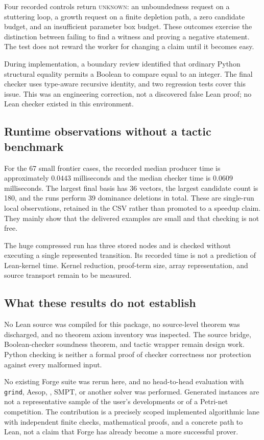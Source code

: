 \documentclass[11pt,a4paper]{article}
\newcommand{\code}[1]{\texttt{\detokenize{#1}}}
\newcommand{\grind}{\texttt{grind}}
\newcommand{\unknown}{\textsc{unknown}}
\theoremstyle{definition}
\theoremstyle{remark}
\begin{document}
Four recorded controls return \unknown{}: an unboundedness request on a stuttering loop, a growth request on a finite depletion path, a zero candidate budget, and an insufficient parameter box budget. These outcomes exercise the distinction between failing to find a witness and proving a negative statement. The test does not reward the worker for changing a claim until it becomes easy.

During implementation, a boundary review identified that ordinary Python structural equality permits a Boolean to compare equal to an integer. The final checker uses type-aware recursive identity, and two regression tests cover this issue. This was an engineering correction, not a discovered false Lean proof; no Lean checker existed in this environment.

\subsection{Runtime observations without a tactic benchmark}
For the 67 small frontier cases, the recorded median producer time is approximately $0.0443$ milliseconds and the median checker time is $0.0609$ milliseconds. The largest final basis has 36 vectors, the largest candidate count is 180, and the runs perform 39 dominance deletions in total. These are single-run local observations, retained in the CSV rather than promoted to a speedup claim. They mainly show that the delivered examples are small and that checking is not free.

The huge compressed run has three stored nodes and is checked without executing a single represented transition. Its recorded time is not a prediction of Lean-kernel time. Kernel reduction, proof-term size, array representation, and source transport remain to be measured.

\subsection{What these results do not establish}
No Lean source was compiled for this package, no source-level theorem was discharged, and no theorem axiom inventory was inspected. The source bridge, Boolean-checker soundness theorem, and tactic wrapper remain design work. Python checking is neither a formal proof of checker correctness nor protection against every malformed input.

No existing Forge suite was rerun here, and no head-to-head evaluation with \grind{}, Aesop, \code{omega}, SMPT, or another solver was performed. Generated instances are not a representative sample of the user's developments or of a Petri-net competition. The contribution is a precisely scoped implemented algorithmic lane with independent finite checks, mathematical proofs, and a concrete path to Lean, not a claim that Forge has already become a more successful prover.
\end{document}
